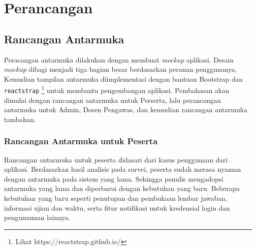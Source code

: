 \chapter{Perancangan}
\label{chap:perancangan}

\section{Rancangan Antarmuka}
    Peracangan antarmuka dilakukan dengan membuat \textit{mockup} aplikasi.
    Desain \textit{mockup} dibagi menjadi tiga bagian besar berdasarkan peranan
    penggunanya. Kemudian tampilan antarmuka diimplementasi dengan bantuan
    Bootstrap dan \texttt{reactstrap} \footnote{Lihat
    https://reactstrap.github.io/} untuk membantu pengembangan aplikasi.
    Pembahasan akan dimulai dengan rancangan antarmuka untuk Perserta, lalu
    perancangan antarmuka untuk Admin, Dosen Pengawas, dan kemudian rancangan
    antarmuka tambahan.

\subsection{Rancangan Antarmuka untuk Peserta}
    Rancangan antarmuka untuk peserta didasari dari kasus penggunaan dari
    aplikasi. Berdasarkan hasil analisis pada survei, peserta sudah merasa
    nyaman dengan antarmuka pada sistem yang lama. Sehingga penulis mengadopsi
    antarmuka yang lama dan diperbarui dengan kebutuhan yang baru. Beberapa
    kebutuhan yang baru seperti penutupan dan pembukaan lembar jawaban,
    informasi ujian dan waktu, serta fitur notifikasi untuk kredensial login dan
    pengumuman lainnya.
    
